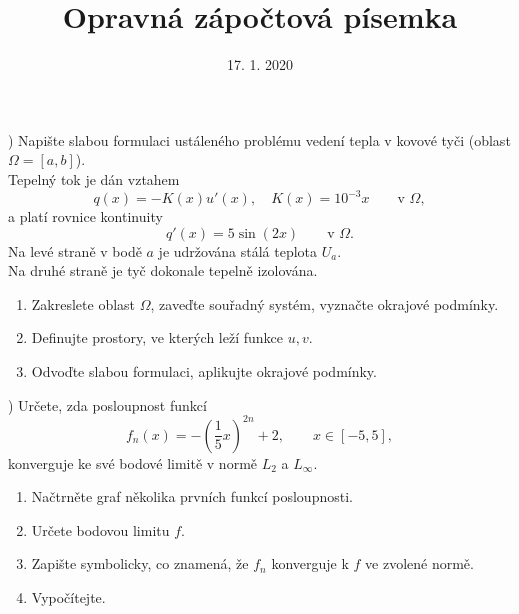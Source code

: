 \documentclass{article}
\begin{document}
\title{Opravná zápočtová písemka}
\date{17. 1. 2020}
\author{}
\maketitle

) \hspace{0.5cm}
Napište slabou formulaci ustáleného problému vedení tepla v kovové tyči (oblast $\Omega=[a,b]$).\\
Tepelný tok je dán vztahem
\[
    q(x) = -K(x)u'(x), \quad K(x)=10^{-3}x \qquad \textrm{v }\Omega,
\]
a platí rovnice kontinuity
\[
    q'(x) = 5\sin(2x) \qquad \textrm{v }\Omega.
\]
\noindent
Na levé straně v bodě $a$ je udržována stálá teplota $U_a$.\\
Na druhé straně je tyč dokonale tepelně izolována.

\begin{enumerate}
\item Zakreslete oblast $\Omega$, zaveďte souřadný systém, vyznačte okrajové podmínky.
\item Definujte prostory, ve kterých leží funkce $u,v$.
\item Odvoďte slabou formulaci, aplikujte okrajové podmínky.
\end{enumerate}




\vspace{1cm}

) \hspace{0.5cm}
Určete, zda posloupnost funkcí
\[
f_n(x) = -\left( \frac{1}{5}x \right)^{2n}+2, \qquad x\in[-5,5],
\]
konverguje ke své bodové limitě v normě $L_2$ a $L_\infty$.

\vspace{2cm}

\begin{enumerate}
\item Načtrněte graf několika prvních funkcí posloupnosti.
\item Určete bodovou limitu $f$.
\item Zapište symbolicky, co znamená, že $f_n$ konverguje k $f$ ve zvolené normě.
\item Vypočítejte.
\end{enumerate}
\end{document}
